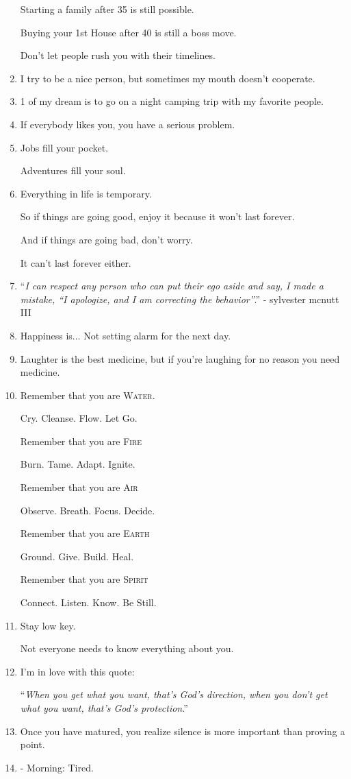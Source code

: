\documentclass{article}
\begin{document}
\begin{enumerate}
	Starting a family after 35 is still possible.
	
	Buying your 1st House after 40 is still a boss move.
	
	Don't let people rush you with their timelines.
	\item I try to be a nice person, but sometimes my mouth doesn't cooperate.
	\item 1 of my dream is to go on a night camping trip with my favorite people.
	\item If everybody likes you, you have a serious problem.
	\item Jobs fill your pocket.
	
	Adventures fill your soul.
	\item Everything in life is temporary.
	
	So if things are going good, enjoy it because it won't last forever.
	
	And if things are going bad, don't worry.
	
	It can't last forever either.
	\item ``\textit{I can respect any person who can put their ego aside and say, I made a mistake, ``I apologize, and I am correcting the behavior''}.'' - sylvester mcnutt III
	\item Happiness is$\ldots$ Not setting alarm for the next day.
	\item Laughter is the best medicine, but if you're laughing for no reason you need medicine.
	\item Remember that you are \textsc{Water}.
	
	Cry. Cleanse. Flow. Let Go.
	
	Remember that you are \textsc{Fire}
	
	Burn. Tame. Adapt. Ignite.
	
	Remember that you are \textsc{Air}
	
	Observe. Breath. Focus. Decide.
	
	Remember that you are \textsc{Earth}
	
	Ground. Give. Build. Heal.
	
	Remember that you are \textsc{Spirit}
	
	Connect. Listen. Know. Be Still.
	\item Stay low key.
	
	Not everyone needs to know everything about you.
	\item I'm in love with this quote:
	
	``\textit{When you get what you want, that's God's direction, when you don't get what you want, that's God's protection}.''
	\item Once you have matured, you realize silence is more important than proving a point.
	\item - Morning: Tired.
	

\end{enumerate}
\end{document}
